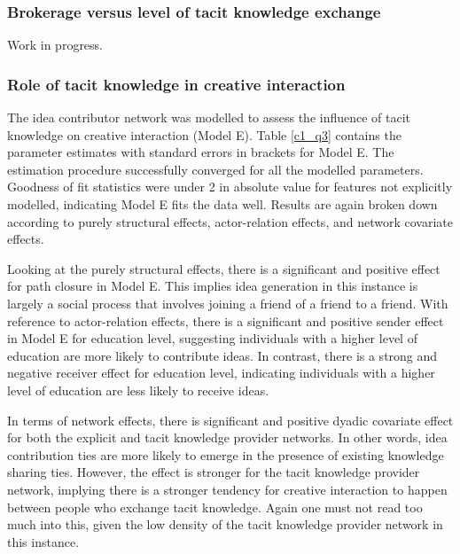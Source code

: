 \subsubsection{Brokerage versus level of tacit knowledge exchange}

Work in progress.

\subsubsection{Role of tacit knowledge in creative interaction}

The idea contributor network was modelled to assess the influence of tacit knowledge on creative interaction (Model E). Table \ref{c1_q3} contains the parameter estimates with standard errors in brackets for Model E. The estimation procedure successfully converged for all the modelled parameters. Goodness of fit statistics were under 2 in absolute value for features not explicitly modelled, indicating Model E fits the data well. Results are again broken down according to purely structural effects, actor-relation effects, and network covariate effects.\medskip 

Looking at the purely structural effects, there is a significant and positive effect for path closure in Model E. This implies idea generation in this instance is largely a social process that involves joining a friend of a friend to a friend. With reference to actor-relation effects, there is a significant and positive sender effect in Model E for education level, suggesting individuals with a higher level of education are more likely to contribute ideas. In contrast, there is a strong and negative receiver effect for education level, indicating individuals with a higher level of education are less likely to receive ideas.\medskip

In terms of network effects, there is significant and positive dyadic covariate effect for both the explicit and tacit knowledge provider networks. In other words, idea contribution ties are more likely to emerge in the presence of existing knowledge sharing ties. However, the effect is stronger for the tacit knowledge provider network, implying there is a stronger tendency for creative interaction to happen between people who exchange tacit knowledge. Again one must not read too much into this, given the low density of the tacit knowledge provider network in this instance.\medskip     

